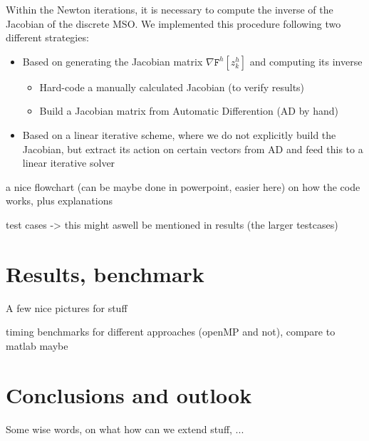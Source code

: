\documentclass[11pt]{scrartcl}
\newcommand{\mSurfDisc}[1]{\ensuremath{\mathtt{F}^h\left[#1\right]}}
\begin{document}
Within the Newton iterations, it is necessary to compute the inverse of the Jacobian of the discrete MSO. We implemented this procedure following two different strategies:
\begin{itemize}
	\item Based on generating the Jacobian matrix $\nabla\mSurfDisc{z^h_k}$ and computing its inverse
	\begin{itemize}
		\item Hard-code a manually calculated Jacobian (to verify results)
		\item Build a Jacobian matrix from Automatic Differention (AD by hand)
	\end{itemize}
	\item Based on a linear iterative scheme, where we do not explicitly build the Jacobian, but extract its action on certain vectors from AD and feed this to a linear iterative solver
\end{itemize}


a nice flowchart (can be maybe done in powerpoint, easier here) on how the code works, plus explanations

test cases -> this might aswell be mentioned in results (the larger testcases)


\section{Results, benchmark}
A few nice pictures for stuff

timing benchmarks for different approaches (openMP and not), compare to matlab maybe



\section{Conclusions and outlook}
Some wise words, on what how can we extend stuff, ...


%

\end{document}
